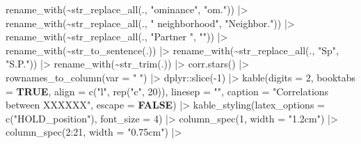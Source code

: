 \documentclass[
  bookmarksnumbered]{article}
\newenvironment{Shaded}{\begin{snugshade}}{\end{snugshade}}
\newcommand{\AttributeTok}[1]{\textcolor[rgb]{0.80,0.80,0.80}{#1}}
\newcommand{\ConstantTok}[1]{\textcolor[rgb]{0.86,0.64,0.64}{\textbf{#1}}}
\newcommand{\DecValTok}[1]{\textcolor[rgb]{0.86,0.86,0.80}{#1}}
\newcommand{\FunctionTok}[1]{\textcolor[rgb]{0.94,0.94,0.56}{#1}}
\newcommand{\NormalTok}[1]{\textcolor[rgb]{0.80,0.80,0.80}{#1}}
\newcommand{\SpecialCharTok}[1]{\textcolor[rgb]{0.86,0.64,0.64}{#1}}
\newcommand{\StringTok}[1]{\textcolor[rgb]{0.80,0.58,0.58}{#1}}
\begin{document}
\begin{Shaded}
\begin{Highlighting}[]
  \FunctionTok{rename\_with}\NormalTok{(}\SpecialCharTok{\textasciitilde{}}\FunctionTok{str\_replace\_all}\NormalTok{(., }\StringTok{"ominance"}\NormalTok{, }\StringTok{"om."}\NormalTok{)) }\SpecialCharTok{|\textgreater{}}
  \FunctionTok{rename\_with}\NormalTok{(}\SpecialCharTok{\textasciitilde{}}\FunctionTok{str\_replace\_all}\NormalTok{(., }\StringTok{" neighborhood"}\NormalTok{, }\StringTok{"Neighbor."}\NormalTok{)) }\SpecialCharTok{|\textgreater{}}
  \FunctionTok{rename\_with}\NormalTok{(}\SpecialCharTok{\textasciitilde{}}\FunctionTok{str\_replace\_all}\NormalTok{(., }\StringTok{"Partner "}\NormalTok{, }\StringTok{""}\NormalTok{)) }\SpecialCharTok{|\textgreater{}}
  \FunctionTok{rename\_with}\NormalTok{(}\SpecialCharTok{\textasciitilde{}}\FunctionTok{str\_to\_sentence}\NormalTok{(.)) }\SpecialCharTok{|\textgreater{}}
  \FunctionTok{rename\_with}\NormalTok{(}\SpecialCharTok{\textasciitilde{}}\FunctionTok{str\_replace\_all}\NormalTok{(., }\StringTok{"Sp"}\NormalTok{, }\StringTok{"S.P."}\NormalTok{)) }\SpecialCharTok{|\textgreater{}}
  \FunctionTok{rename\_with}\NormalTok{(}\SpecialCharTok{\textasciitilde{}}\FunctionTok{str\_trim}\NormalTok{(.)) }\SpecialCharTok{|\textgreater{}}
  \FunctionTok{corr.stars}\NormalTok{() }\SpecialCharTok{|\textgreater{}}
  \FunctionTok{rownames\_to\_column}\NormalTok{(}\AttributeTok{var =} \StringTok{" "}\NormalTok{) }\SpecialCharTok{|\textgreater{}} 
\NormalTok{  dplyr}\SpecialCharTok{::}\FunctionTok{slice}\NormalTok{(}\SpecialCharTok{{-}}\DecValTok{1}\NormalTok{) }\SpecialCharTok{|\textgreater{}} 
  \FunctionTok{kable}\NormalTok{(}\AttributeTok{digits =} \DecValTok{2}\NormalTok{,}
        \AttributeTok{booktabs =} \ConstantTok{TRUE}\NormalTok{,}
        \AttributeTok{align =} \FunctionTok{c}\NormalTok{(}\StringTok{"l"}\NormalTok{, }\FunctionTok{rep}\NormalTok{(}\StringTok{"c"}\NormalTok{, }\DecValTok{20}\NormalTok{)),}
        \AttributeTok{linesep =} \StringTok{""}\NormalTok{,}
        \AttributeTok{caption =} \StringTok{"Correlations between XXXXXX"}\NormalTok{,}
        \AttributeTok{escape =} \ConstantTok{FALSE}\NormalTok{) }\SpecialCharTok{|\textgreater{}}
  \FunctionTok{kable\_styling}\NormalTok{(}\AttributeTok{latex\_options =} \FunctionTok{c}\NormalTok{(}\StringTok{"HOLD\_position"}\NormalTok{),}
                \AttributeTok{font\_size =} \DecValTok{4}\NormalTok{) }\SpecialCharTok{|\textgreater{}}
  \FunctionTok{column\_spec}\NormalTok{(}\DecValTok{1}\NormalTok{, }\AttributeTok{width =} \StringTok{"1.2cm"}\NormalTok{) }\SpecialCharTok{|\textgreater{}}
  \FunctionTok{column\_spec}\NormalTok{(}\DecValTok{2}\SpecialCharTok{:}\DecValTok{21}\NormalTok{, }\AttributeTok{width =} \StringTok{"0.75cm"}\NormalTok{) }\SpecialCharTok{|\textgreater{}}

\end{Highlighting}
\end{Shaded}
\end{document}
